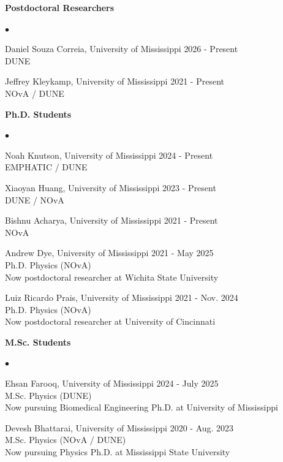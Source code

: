\documentclass[margin, line]{res}
\newenvironment{list2}{
	\begin{list}{$\bullet$}{%
		\setlength{\itemsep}{0in}
		\setlength{\parsep}{0in} \setlength{\parskip}{0in}
		\setlength{\topsep}{0in} \setlength{\partopsep}{0in}
		\setlength{\leftmargin}{0.2in}}}{\end{list}}
\renewcommand{\em}{\upshape\sffamily}
\begin{document}
\begin{resume}
{\bf Postdoctoral Researchers}
\begin{list2}
	\item Daniel Souza Correia, University of Mississippi \hfill{2026 - Present}\\
	{\em DUNE} %
	\item Jeffrey Kleykamp, University of Mississippi \hfill{2021 - Present}\\
	{\em NOvA / DUNE} %
\end{list2}

{\bf Ph.D. Students}
\begin{list2}
	\item Noah Knutson, University of Mississippi \hfill{2024 - Present}\\
	{\em EMPHATIC / DUNE}
	\item Xiaoyan Huang, University of Mississippi \hfill{2023 - Present}\\
	{\em DUNE / NOvA}
	\item Bishnu Acharya, University of Mississippi \hfill{2021 - Present}\\
	{\em NOvA}
	\item Andrew Dye, University of Mississippi \hfill{2021 - May 2025}\\
	{\em Ph.D. Physics (NOvA)}\\
	Now postdoctoral researcher at Wichita State University
	\item Luiz Ricardo Prais, University of Mississippi \hfill{2021 - Nov. 2024}\\
	{\em Ph.D. Physics (NOvA)}\\
	Now postdoctoral researcher at University of Cincinnati
\end{list2}

{\bf M.Sc. Students}
\begin{list2}
	\item Ehsan Farooq, University of Mississippi \hfill{2024 - July 2025}\\
	{\em M.Sc. Physics (DUNE)}\\
	Now pursuing Biomedical Engineering Ph.D. at University of Mississippi
	\item Devesh Bhattarai, University of Mississippi \hfill{2020 - Aug. 2023}\\
	{\em M.Sc. Physics (NOvA / DUNE)}\\
	Now pursuing Physics Ph.D. at Mississippi State University
\end{list2}


\end{resume}
\end{document}
